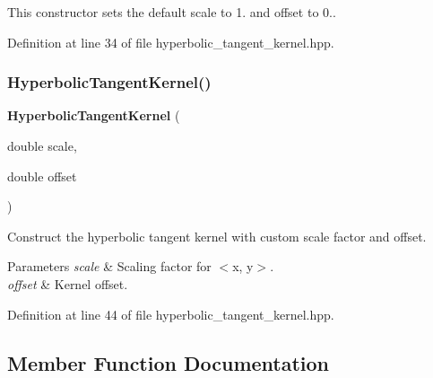 This constructor sets the default scale to 1. and offset to 0.. 



Definition at line 34 of file hyperbolic\+\_\+tangent\+\_\+kernel.\+hpp.

\mbox{\label{classmlpack_1_1kernel_1_1HyperbolicTangentKernel_aba0806631693a6fd7451e27d878b3665}} 
\subsubsection{Hyperbolic\+Tangent\+Kernel()\hspace{0.1cm}{\footnotesize\ttfamily [2/2]}}
{\footnotesize\ttfamily \textbf{ Hyperbolic\+Tangent\+Kernel} (\begin{DoxyParamCaption}\item[{double}]{scale,  }\item[{double}]{offset }\end{DoxyParamCaption})\hspace{0.3cm}{\ttfamily [inline]}}



Construct the hyperbolic tangent kernel with custom scale factor and offset. 


\begin{DoxyParams}{Parameters}
{\em scale} & Scaling factor for $<$x, y$>$. \\
\hline
{\em offset} & Kernel offset. \\
\hline
\end{DoxyParams}


Definition at line 44 of file hyperbolic\+\_\+tangent\+\_\+kernel.\+hpp.



\subsection{Member Function Documentation}
\mbox{\label{classmlpack_1_1kernel_1_1HyperbolicTangentKernel_a7bc3cfc0ee3750ba84ee4dc7f62994ae}} 
